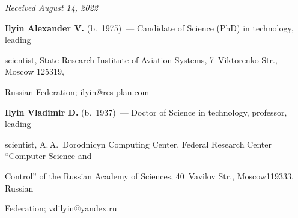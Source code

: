 \hfill{\small\textit{Received August 14, 2022}} 










\Contr





\noindent


\textbf{Ilyin Alexander V.} (b.\ 1975)~--- Candidate of Science (PhD) in technology, leading 


scientist, State Research Institute of Aviation Systems, 7~Viktorenko Str., Moscow 125319, 


Russian Federation; \mbox{ilyin@res-plan.com}





\vspace*{3pt}





\noindent


\textbf{Ilyin Vladimir D.} (b.\ 1937)~--- Doctor of Science in technology, professor, leading 


scientist, A.\,A.~Dorodnicyn Computing Center, Federal Research Center ``Computer Science and 


Control'' of the Russian Academy of Sciences, 40~Vavilov Str., Moscow119333, Russian 


Federation; \mbox{vdilyin@yandex.ru}


  


\label{end\stat}





\renewcommand{\bibname}{\protect\rm Литература} 



